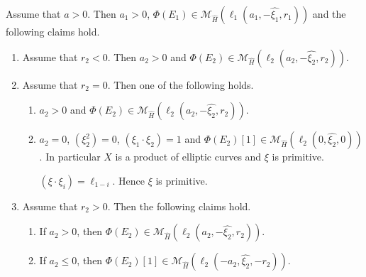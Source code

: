\documentclass[10pt,a4paper]{amsart}
\newcommand{\cal}{\mathcal}
\begin{document}
\begin{lem}\label{lem:a>0}
Assume that $a >0$.
Then $a_1>0$,
$\Phi(E_1) \in
{\cal M}_{\widehat{H}}(\ell_1(a_1,-\widehat{\xi_1},r_1))$
and the following claims hold.
\begin{enumerate}
\item[(1)]
Assume that $r_2<0$.
Then $a_2>0$ and $\Phi(E_2) \in {\cal M}_{\widehat{H}}(\ell_2(a_2,-\widehat{\xi_2},r_2))$.
\item[(2)]
Assume that $r_2=0$.
Then one of the following holds.
\begin{enumerate}
\item
$a_2>0$ and $\Phi(E_2) \in {\cal M}_{\widehat{H}}(\ell_2(a_2,-\widehat{\xi_2},r_2))$.
\item
$a_2=0$, 
$(\xi_2^2)=0$, $(\xi_1 \cdot \xi_2)=1$
and $\Phi(E_2)[1] \in {\cal M}_{\widehat{H}}(\ell_2(0,\widehat{\xi_2},0))$.
In particular $X$ is a product of elliptic curves and $\xi$ is primitive.
\begin{NB}
$(\xi \cdot \xi_i)=\ell_{1-i}$.
Hence $\xi$ is primitive. 
\end{NB}
\end{enumerate}
\item[(3)]
Assume that $r_2>0$. Then the following claims hold.
\begin{enumerate}
\item
If $a_2 > 0$, then
$\Phi(E_2) \in {\cal M}_{\widehat{H}}(\ell_2(a_2,-\widehat{\xi_2},r_2))$.
\item
If $a_2 \leq 0$, then 
$\Phi(E_2)[1] \in {\cal M}_{\widehat{H}}(\ell_2(-a_2,\widehat{\xi_2},-r_2))$. 
\end{enumerate}
\end{enumerate}
\end{lem}
\end{document}
